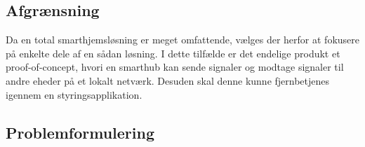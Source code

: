 \documentclass[11pt]{article}
\begin{document}
\subsection{Afgrænsning}
\label{sec:org3ad0a47}
Da en total smarthjemsløsning er meget omfattende, vælges der herfor at fokusere på enkelte dele af en sådan løsning. I dette tilfælde er det endelige produkt et proof-of-concept, hvori en smarthub kan sende signaler og modtage signaler til andre eheder på et lokalt netværk. Desuden skal denne kunne fjernbetjenes igennem en styringsapplikation.
\subsection{Problemformulering}
\label{sec:org24f278a}
\end{document}
